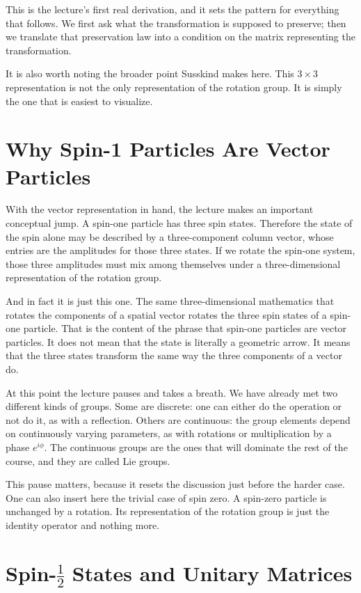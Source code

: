 This is the lecture's first real derivation, and it sets the pattern for everything that follows. We first ask what the transformation is supposed to preserve; then we translate that preservation law into a condition on the matrix representing the transformation.

It is also worth noting the broader point Susskind makes here. This \(3\times 3\) representation is not the only representation of the rotation group. It is simply the one that is easiest to visualize.

\section{Why Spin-1 Particles Are Vector Particles}

With the vector representation in hand, the lecture makes an important conceptual jump. A spin-one particle has three spin states. Therefore the state of the spin alone may be described by a three-component column vector, whose entries are the amplitudes for those three states. If we rotate the spin-one system, those three amplitudes must mix among themselves under a three-dimensional representation of the rotation group.

And in fact it is just this one. The same three-dimensional mathematics that rotates the components of a spatial vector rotates the three spin states of a spin-one particle. That is the content of the phrase that spin-one particles are vector particles. It does not mean that the state is literally a geometric arrow. It means that the three states transform the same way the three components of a vector do.

At this point the lecture pauses and takes a breath. We have already met two different kinds of groups. Some are discrete: one can either do the operation or not do it, as with a reflection. Others are continuous: the group elements depend on continuously varying parameters, as with rotations or multiplication by a phase \(e^{i\phi}\). The continuous groups are the ones that will dominate the rest of the course, and they are called Lie groups.

This pause matters, because it resets the discussion just before the harder case. One can also insert here the trivial case of spin zero. A spin-zero particle is unchanged by a rotation. Its representation of the rotation group is just the identity operator and nothing more.

\section{Spin-$\frac12$ States and Unitary Matrices}

